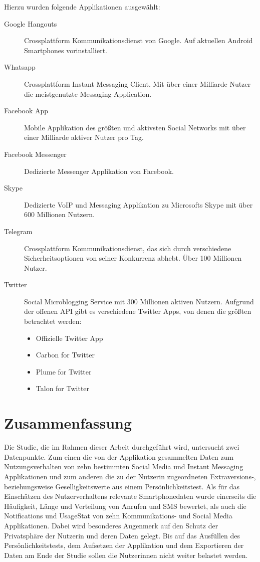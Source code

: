 Hierzu wurden folgende Applikationen ausgewählt:
\begin{description}
  \item [Google Hangouts] Crossplattform Kommunikationsdienst von Google. Auf aktuellen Android Smartphones vorinstalliert.
  \item [Whatsapp] Crossplattform Instant Messaging Client. Mit über einer Milliarde Nutzer die meistgenutzte Messaging Application\cite{whatsappuser}.
  \item [Facebook App] Mobile Applikation des größten und aktivsten Social Networks mit über einer Milliarde aktiver Nutzer pro Tag\cite{facebookuser}.
  \item [Facebook Messenger] Dedizierte Messenger Applikation von Facebook.
  \item [Skype] Dedizierte VoIP und Messaging Applikation zu Microsofts Skype mit über 600 Millionen Nutzern\cite{skypeuser}.
  \item [Telegram] Crossplattform Kommunikationsdienst, das sich durch verschiedene Sicherheitsoptionen von seiner Konkurrenz abhebt. Über 100 Millionen Nutzer\cite{telegramuser}.
  \item [Twitter] Social Microblogging Service mit 300 Millionen aktiven Nutzern. Aufgrund der offenen API gibt es verschiedene Twitter Apps, von denen die größten betrachtet werden:
  \begin{itemize}
      \item Offizielle Twitter App
      \item Carbon for Twitter
      \item Plume for Twitter
      \item Talon for Twitter
  \end{itemize}
\end{description}




\section{Zusammenfassung}
\label{ch:Entwurf:sec:zusammenfassung}

Die Studie, die im Rahmen dieser Arbeit durchgeführt wird, untersucht zwei Datenpunkte.
Zum einen die von der Applikation gesammelten Daten zum Nutzungsverhalten von zehn bestimmten Social Media und Instant Messaging Applikationen
und zum anderen die zu der Nutzerin zugeordneten Extraversions-, beziehungsweise Geselligkeitswerte aus einem Persönlichkeitstest.
Als für das Einschätzen des Nutzerverhaltens relevante Smartphonedaten wurde einerseits die Häufigkeit, Länge und Verteilung von  Anrufen und SMS bewertet,
als auch die Notifications und UsageStat von zehn Kommunikations- und Social Media Applikationen.
Dabei wird besonderes Augenmerk auf den Schutz der Privatsphäre der Nutzerin und deren Daten gelegt.
Bis auf das Ausfüllen des Persönlichkeitstests, dem Aufsetzen der Applikation und dem Exportieren der Daten am Ende der Studie sollen die Nutzerinnen nicht weiter belastet werden.



